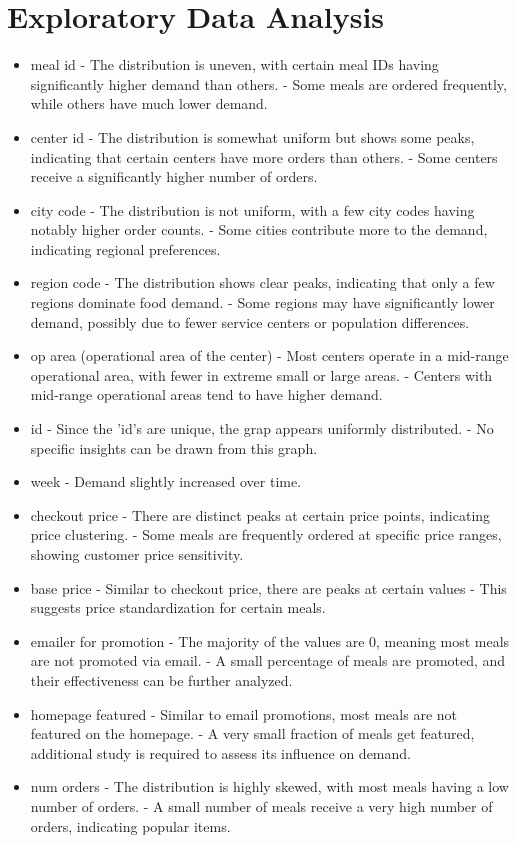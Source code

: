 \documentclass[12pt]{article}
\begin{document}
\section{Exploratory Data Analysis}
\begin{itemize}
\item{ meal id}
- The distribution is uneven, with certain meal IDs having significantly higher demand than others.
- Some meals are ordered frequently, while others have much lower demand.
\item{ center id}
- The distribution is somewhat uniform but shows some peaks, indicating that certain centers have more orders than others.
- Some centers receive a significantly higher number of orders.
\item{city code}
- The distribution is not uniform, with a few city codes having notably higher order counts.
- Some cities contribute more to the demand, indicating regional preferences.
\item{ region code}
- The distribution shows clear peaks, indicating that only a few regions dominate food demand.
- Some regions may have significantly lower demand, possibly due to fewer service centers or population differences.
\item{ op area (operational area of the center)}
- Most centers operate in a mid-range operational area, with fewer in extreme small or large areas.
- Centers with mid-range operational areas tend to have higher demand.
\item{id}
- Since the 'id's are unique, the grap appears uniformly distributed.
- No specific insights can be drawn from this graph.
\item{ week}
- Demand slightly increased over time.
\item{ checkout price}
- There are distinct peaks at certain price points, indicating price clustering.
- Some meals are frequently ordered at specific price ranges, showing customer price sensitivity.
\item{base price}
- Similar to checkout price, there are peaks at certain values 
- This suggests price standardization for certain meals.
\item{ emailer for promotion}
- The majority of the values are 0, meaning most meals are not promoted via email.
- A small percentage of meals are promoted, and their effectiveness can be further analyzed.
\item{ homepage featured}
- Similar to email promotions, most meals are not featured on the homepage.
- A very small fraction of meals get featured, additional study is required to assess its influence on demand.
\item{ num orders}
- The distribution is highly skewed, with most meals having a low number of orders.
- A small number of meals receive a very high number of orders, indicating popular items.
\end{itemize}
\end{document}
